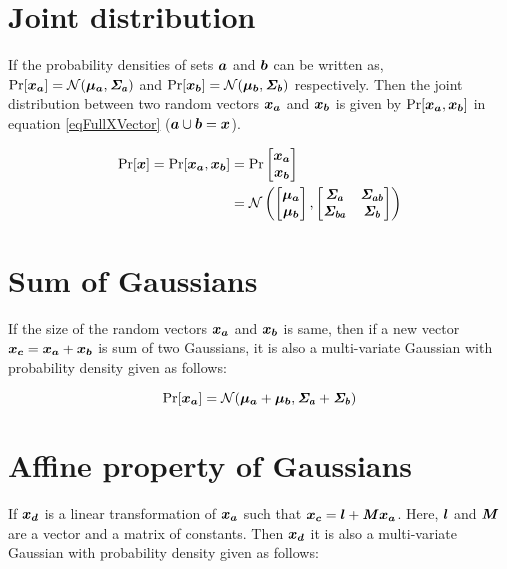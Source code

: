 \section{Joint distribution}
If the probability densities of sets $\boldsymbol{a}$ and $\boldsymbol{b}$ can be written as, $\Pr[\boldsymbol{x_a}] = \mathcal{N}(\boldsymbol{\mu_a}, \bm{\mathit{\Sigma_a}})$ and $\Pr[\boldsymbol{x_b}] = \mathcal{N}(\boldsymbol{\mu_b}, \bm{\mathit{\Sigma_b}})$ respectively. Then the joint distribution between two random vectors $\boldsymbol{x_a}$ and $\boldsymbol{x_b}$ is given by $\Pr[\boldsymbol{x_a}, \boldsymbol{x_b}]$ in equation \ref{eqFullXVector} ($\boldsymbol{a} \cup \boldsymbol{b} = \boldsymbol{x}$).

\begin{align}\label{eqFullXVector}
    \Pr  [ \boldsymbol{x}  ]  = \Pr  [ \boldsymbol{x_a}, \boldsymbol{x_b}]& = \Pr \begin{bmatrix}
\boldsymbol{x_a}\\ 
\boldsymbol{x_b}
\end{bmatrix} \\ 
& = \mathcal{N} \left ( \begin{bmatrix}
\boldsymbol{\mu_a}\\ 
\boldsymbol{\mu_b}
\end{bmatrix}, \begin{bmatrix}
\bm{\mathit{\Sigma_a}} & \bm{\mathit{\Sigma_{ab}}}\\ 
\bm{\mathit{\Sigma_{ba}}} & \bm{\mathit{\Sigma_b}}
\end{bmatrix} \right )
\end{align}

\section{Sum of Gaussians}
If the size of the random vectors $\boldsymbol{x_a}$ and $\boldsymbol{x_b}$ is same, then if a new vector $\boldsymbol{x_c} = \boldsymbol{x_a} + \boldsymbol{x_b}$ is sum of two Gaussians, it is also a multi-variate Gaussian with probability density given as follows:

\begin{equation}
    \Pr[\boldsymbol{x_a}] = \mathcal{N}(\boldsymbol{\mu_a} + \boldsymbol{\mu_b}, \bm{\mathit{\Sigma_a}} + \bm{\mathit{\Sigma_b}})
\end{equation}

\section{Affine property of Gaussians}\label{appAffine}
If $\boldsymbol{x_d}$ is a linear transformation of $\boldsymbol{x_a}$ such that $\boldsymbol{x_c} = \boldsymbol{l} + \bm{\mathit{M}}\boldsymbol{x_a}$. Here, $\boldsymbol{l}$ and $\bm{\mathit{M}}$ are a vector and a matrix of constants. Then $\boldsymbol{x_d}$ it is also a multi-variate Gaussian with probability density given as follows:

